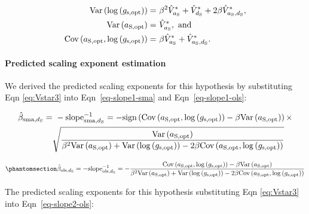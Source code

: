 \documentclass[
  letterpaper,
  DIV=11,
  numbers=noendperiod]{scrartcl}
\let\oldparagraph\paragraph
\renewcommand{\paragraph}[1]{\oldparagraph{#1}\mbox{}}
\begin{document}
\begin{align}
\label{eq:Vag}
  \text{Var} \left(\log \left( g_\mathrm{s,opt} \right) \right) =~& \beta^2 \hat{V}_{a_\mathrm{S}}^* + \hat{V}_{d_\mathrm{S}}^* + 2 \beta \hat{V}_{a_\mathrm{S},d_\mathrm{S}}^*, \notag \\
  \text{Var} \left( a_\mathrm{S,opt} \right) =~& \hat{V}_{a_\mathrm{S}}^*,~\text{and} \notag \\
  \text{Cov} \left(a_\mathrm{S,opt},\log \left( g_\mathrm{s,opt} \right) \right) =~& \beta \hat{V}_{a_\mathrm{S}}^* + \hat{V}_{a_\mathrm{S},d_\mathrm{S}}^*.
\end{align}

\paragraph{Predicted scaling exponent
estimation}\label{predicted-scaling-exponent-estimation-2}

We derived the predicted scaling exponents for this hypothesis by
substituting Eqn \ref{eq:Vstar3} into Eqn~\ref{eq-slope1-sma} and
Eqn~\ref{eq-slope1-ols}:

\begin{align}
\label{eq:est-sma13}
\hat{\beta}_{\text{sma},d_\mathrm{S}} =&~ -\text{slope}_{\text{sma},d_\mathrm{S}}^{-1} = -\text{sign} \left( \text{Cov} \left(a_\mathrm{S,opt}, \log \left(g_\mathrm{s,opt} \right) \right) - \beta \text{Var} \left( a_\mathrm{S,opt} \right) \right) \times \notag \\ & \sqrt{\frac{\text{Var} \left( a_\mathrm{S,opt} \right)}{\beta ^2 \text{Var} \left( a_\mathrm{S,opt} \right) + \text{Var} \left(\log \left( g_\mathrm{s,opt} \right) \right) - 2 \beta \text{Cov} \left(a_\mathrm{S,opt}, \log \left(g_\mathrm{s,opt} \right) \right)}}
\end{align}

\begin{equation}\phantomsection\label{eq-est-ols13}{\hat{\beta}_{\text{ols},d_\mathrm{S}} = -\text{slope}_{\text{ols},d_\mathrm{S}}^{-1} = -\frac{ \text{Cov} \left(a_\mathrm{S,opt}, \log \left(g_\mathrm{s,opt} \right) \right) - \beta \text{Var} \left( a_\mathrm{S,opt} \right) }{\beta ^2 \text{Var} \left( a_\mathrm{S,opt} \right) + \text{Var} \left(\log \left( g_\mathrm{s,opt} \right) \right) - 2 \beta \text{Cov} \left(a_\mathrm{S,opt}, \log \left(g_\mathrm{s,opt} \right) \right)}}\end{equation}

The predicted scaling exponents for this hypothesis substituting Eqn
\ref{eq:Vstar3} into Eqn~\ref{eq-slope2-ols}:
\end{document}
